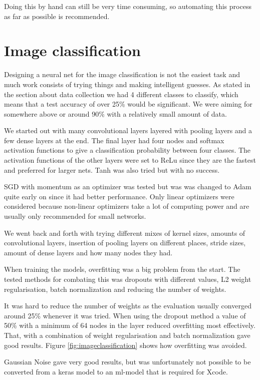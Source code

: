 Doing this by hand can still be very time consuming, so automating this process as far as possible is recommended.

\section{Image classification}
\label{sec:NNclassification}
Designing a neural net for the image classification is not the easiest task and much
work consists of trying things and making intelligent guesses.
As stated in the section about data collection we had 4 different classes to classify,
which means that a test accuracy of over 25\% would be significant. We were aiming for
somewhere above or around 90\% with a relatively small amount of data.

We started out with many convolutional layers layered with pooling layers and a few dense
layers at the end. The final layer had four nodes and softmax activation functions to give a
classification probability between four classes.
The activation functions of the other layers were set to ReLu since they are the fastest
and preferred for larger nets. Tanh was also tried but with no success.

SGD with momentum as an optimizer was tested but was was changed to Adam
quite early on since it had better performance.
Only linear optimizers were considered because non-linear optimizers take a lot of
computing power and are usually only recommended for small networks.

We went back and forth with trying different mixes of kernel sizes, amounts of convolutional
layers, insertion of pooling layers on different places, stride sizes, amount of dense layers
and how many nodes they had.

When training the models, overfitting was a big problem from the start. The tested methods
for combating this was dropouts with different values, L2 weight regularisation,
batch normalization and reducing the number of weights.

It was hard to reduce the number of weights as the evaluation usually converged around 25\%
whenever it was tried.
When using the dropout method a value of 50\% with a minimum of 64 nodes in the layer
reduced overfitting most effectively. That, with a combination of weight regularisation and batch 
normalization gave good results. Figure \ref{fig:imageclassification} shows how overfitting was avoided.

Gaussian Noise gave very good results, but was unfortunately not possible to be 
converted from a keras model to an ml-model that is required for Xcode.

